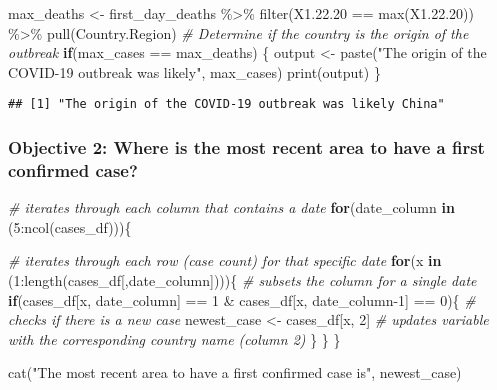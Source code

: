 \documentclass[
]{article}
\newenvironment{Shaded}{\begin{snugshade}}{\end{snugshade}}
\newcommand{\CommentTok}[1]{\textcolor[rgb]{0.56,0.35,0.01}{\textit{#1}}}
\newcommand{\ControlFlowTok}[1]{\textcolor[rgb]{0.13,0.29,0.53}{\textbf{#1}}}
\newcommand{\DecValTok}[1]{\textcolor[rgb]{0.00,0.00,0.81}{#1}}
\newcommand{\FloatTok}[1]{\textcolor[rgb]{0.00,0.00,0.81}{#1}}
\newcommand{\FunctionTok}[1]{\textcolor[rgb]{0.00,0.00,0.00}{#1}}
\newcommand{\NormalTok}[1]{#1}
\newcommand{\OtherTok}[1]{\textcolor[rgb]{0.56,0.35,0.01}{#1}}
\newcommand{\SpecialCharTok}[1]{\textcolor[rgb]{0.00,0.00,0.00}{#1}}
\newcommand{\StringTok}[1]{\textcolor[rgb]{0.31,0.60,0.02}{#1}}
\begin{document}
\begin{Shaded}
\begin{Highlighting}[]
\NormalTok{max\_deaths }\OtherTok{\textless{}{-}}\NormalTok{ first\_day\_deaths }\SpecialCharTok{\%\textgreater{}\%}
  \FunctionTok{filter}\NormalTok{(X1.}\FloatTok{22.20} \SpecialCharTok{==} \FunctionTok{max}\NormalTok{(X1.}\FloatTok{22.20}\NormalTok{)) }\SpecialCharTok{\%\textgreater{}\%}
  \FunctionTok{pull}\NormalTok{(Country.Region)}
\CommentTok{\# Determine if the country is the origin of the outbreak}
\ControlFlowTok{if}\NormalTok{(max\_cases }\SpecialCharTok{==}\NormalTok{ max\_deaths) \{}
\NormalTok{  output }\OtherTok{\textless{}{-}} \FunctionTok{paste}\NormalTok{(}\StringTok{"The origin of the COVID{-}19 outbreak was likely"}\NormalTok{, max\_cases)}
  \FunctionTok{print}\NormalTok{(output)}
\NormalTok{\}}
\end{Highlighting}
\end{Shaded}

\begin{verbatim}
## [1] "The origin of the COVID-19 outbreak was likely China"
\end{verbatim}

\hypertarget{objective-2-where-is-the-most-recent-area-to-have-a-first-confirmed-case}{%
\subsubsection{Objective 2: Where is the most recent area to have a
first confirmed
case?}\label{objective-2-where-is-the-most-recent-area-to-have-a-first-confirmed-case}}

\begin{Shaded}
\begin{Highlighting}[]
\CommentTok{\# iterates through each column that contains a date}
\ControlFlowTok{for}\NormalTok{(date\_column }\ControlFlowTok{in}\NormalTok{ (}\DecValTok{5}\SpecialCharTok{:}\FunctionTok{ncol}\NormalTok{(cases\_df)))\{}
  
  \CommentTok{\# iterates through each row (case count) for that specific date}
  \ControlFlowTok{for}\NormalTok{(x }\ControlFlowTok{in}\NormalTok{ (}\DecValTok{1}\SpecialCharTok{:}\FunctionTok{length}\NormalTok{(cases\_df[,date\_column])))\{ }\CommentTok{\# subsets the column for a single date}
    \ControlFlowTok{if}\NormalTok{(cases\_df[x, date\_column] }\SpecialCharTok{==} \DecValTok{1} \SpecialCharTok{\&}\NormalTok{ cases\_df[x, date\_column}\DecValTok{{-}1}\NormalTok{] }\SpecialCharTok{==} \DecValTok{0}\NormalTok{)\{ }\CommentTok{\# checks if there is a new case }
\NormalTok{      newest\_case }\OtherTok{\textless{}{-}}\NormalTok{ cases\_df[x, }\DecValTok{2}\NormalTok{] }\CommentTok{\# updates variable with the corresponding country name (column 2) }
\NormalTok{    \}}
\NormalTok{  \}}
\NormalTok{\}}

\FunctionTok{cat}\NormalTok{(}\StringTok{"The most recent area to have a first confirmed case is"}\NormalTok{, newest\_case)}
\end{Highlighting}
\end{Shaded}
\end{document}
